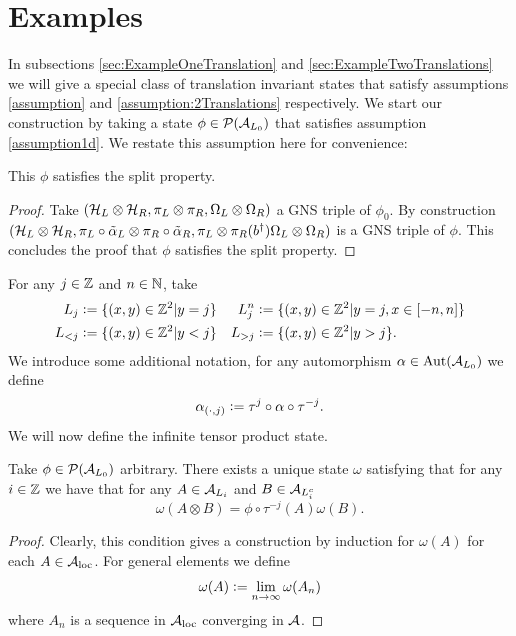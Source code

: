 \documentclass[11pt,a4paper,twoside]{article}
\numberwithin{equation}{section}
\begin{document}
	\section{Examples}\label{sec:examples}
	In subsections \ref{sec:ExampleOneTranslation} and \ref{sec:ExampleTwoTranslations} we will give a special class of translation invariant states that satisfy assumptions \ref{assumption} and \ref{assumption:2Translations} respectively. We start our construction by taking a state $\phi\in\PP(\AA_{L_0})$ that satisfies assumption \ref{assumption1d}. We restate this assumption here for convenience:
	\assumptionOneDimensionalOne*
	\begin{lemma}\label{lem:phiExampleConsistentWithConjectureSplitProperty}
		This $\phi$ satisfies the split property.
	\end{lemma}
	\begin{proof}
		Take $(\HH_L\otimes\HH_R,\pi_L\otimes\pi_R,\Omega_L\otimes\Omega_R)$ a GNS triple of $\phi_0$. By construction $(\HH_L\otimes\HH_R,\pi_L\circ\tilde\alpha_L\otimes\pi_R\circ\tilde\alpha_R,\pi_L\otimes\pi_R(b^\dagger)\Omega_L\otimes\Omega_R)$ is a GNS triple of $\phi$. This concludes the proof that $\phi$ satisfies the split property.
	\end{proof}
	For any $j\in\ZZ$ and $n\in\NN$, take
	\begin{align}
		L_j&\defeq \{(x,y)\in\ZZ^2|y=j\}&L_{j}^{n}&\defeq \{(x,y)\in\ZZ^2|y=j,x\in[-n,n]\}\\
		L_{<j}&\defeq \{(x,y)\in\ZZ^2|y<j\}&L_{>j}&\defeq \{(x,y)\in\ZZ^2|y>j\}.
	\end{align}
	We introduce some additional notation, for any automorphism $\alpha\in\Aut{\AA_{L_0}}$ we define 
	\begin{equation}
		\alpha_{(\cdot,j)}\defeq \tau^j\circ\alpha\circ\tau^{-j}.
	\end{equation}
	We will now define the infinite tensor product state.
	\begin{definition}\label{def:InfiniteTensorProductState}
		Take $\phi\in\PP(\AA_{L_0})$ arbitrary. There exists a unique state $\omega$ satisfying that for any $i\in\ZZ$ we have that for any $A\in\AA_{L_i}$ and $B\in\AA_{L_i^c}$
		\begin{equation}
			\omega(A\otimes B)=\phi\circ\tau^{-j}(A)\omega(B).
		\end{equation}
	\end{definition}
	\begin{proof}
		Clearly, this condition gives a construction by induction for $\omega(A)$ for each $A\in\AA_{\text{loc}}$. For general elements we define
		\begin{equation}
			\omega(A)\defeq \lim_{n\rightarrow\infty}\omega(A_n)
		\end{equation}
		where $A_n$ is a sequence in $\AA_{\text{loc}}$ converging in $\AA$.
	\end{proof}
\end{document}
